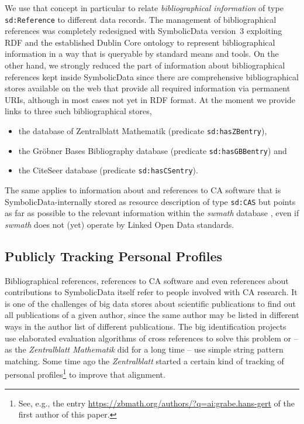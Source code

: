 \documentclass{llncs}
\newcommand{\SD}{{\sc Symbolic\-Data}}
\begin{document}
We use that concept in particular to relate \emph{bibliographical information}
of type \texttt{sd:Reference} to different data records.  The management of
bibliographical re\-fe\-ren\-ces was completely redesigned with {\SD}
version~3 exploiting RDF and the established Dublin Core ontology
\cite{dcterms} to represent bibliographical information in a way that is
queryable by standard means and tools. On the other hand, we strongly reduced
the part of information about bibliographical refe\-rences kept inside {\SD}
since there are comprehensive bibliographical stores available on the web that
provide all required information via permanent URIs, although in most cases
not yet in RDF format.  At the moment we provide links to three such
bibliographical stores,
\begin{itemize}
\item the database of Zentralblatt Mathematik (predicate
  \texttt{sd:hasZBentry}), 
\item the Gr\"obner Bases Bibliography database (predicate
  \texttt{sd:hasGBBentry}) and 
\item the CiteSeer database (predicate \texttt{sd:hasCSentry}).
\end{itemize}

The same applies to information about and references to CA software that is
\SD-internally stored as resource description of type \texttt{sd:CAS} but
points as far as possible to the relevant information within the \emph{swmath}
database \cite{swmath}, even if \emph{swmath} does not (yet) operate by Linked
Open Data standards.

\subsection{Publicly Tracking Personal Profiles}

Bibliographical references, references to CA software and even references
about contributions to {\SD} itself refer to people involved with CA research.
It is one of the challenges of big data stores about scientific publications
to find out all publications of a given author, since the same author may be
listed in different ways in the author list of different publications.  The
big identification projects use elaborated evaluation algorithms of cross
references to solve this problem or -- as the \emph{Zentralblatt Mathematik}
did for a long time -- use simple string pattern matching.  Some time ago the
\emph{Zentralblatt} started a certain kind of tracking of personal
profiles\footnote{See, e.g., the entry
  \url{https://zbmath.org/authors/?q=ai:grabe.hans-gert} of the first author
  of this paper.} to improve that alignment.
\end{document}
